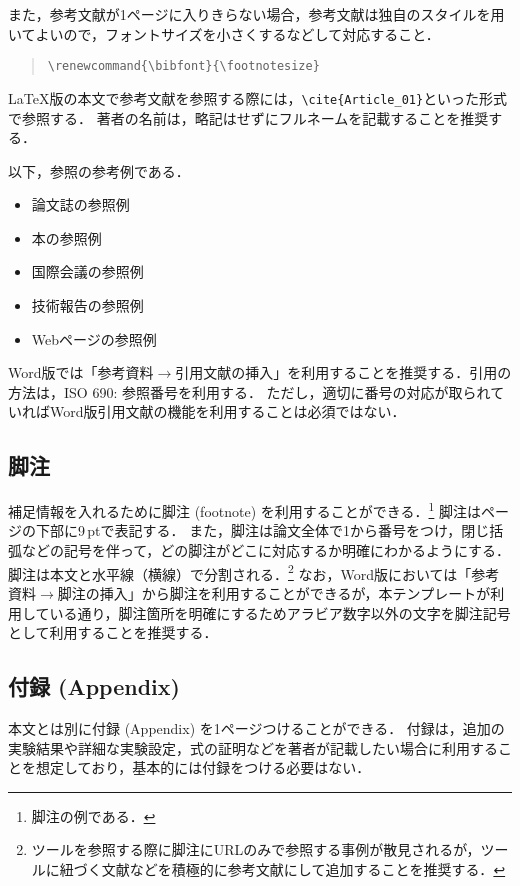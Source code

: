 \documentclass[
  platex, dvipdfmx,  %
]{nlp2024}
\begin{document}
%
また，参考文献が1ページに入りきらない場合，参考文献は独自のスタイルを用いてよいので，フォントサイズを小さくするなどして対応すること．
\begin{quote}
\verb|\renewcommand{\bibfont}{\footnotesize}|
\end{quote}



LaTeX版の本文で参考文献を参照する際には，\verb|\cite{Article_01}|といった形式で参照する．
%
著者の名前は，略記はせずにフルネームを記載することを推奨する．

以下，参照の参考例である．
\begin{itemize}
\item 論文誌の参照例 \cite{Article_01}
\item 本の参照例 \cite{Book_02}
\item 国際会議の参照例 \cite{Inproc_03}
\item 技術報告の参照例 \cite{Techrep_05}
\item Webページの参照例 \cite{Web_06}
\end{itemize}

Word版では「参考資料$\xrightarrow{}$引用文献の挿入」を利用することを推奨する．引用の方法は，ISO 690: 参照番号を利用する．
ただし，適切に番号の対応が取られていればWord版引用文献の機能を利用することは必須ではない．


\subsection{脚注}
補足情報を入れるために脚注 (footnote) を利用することができる．\footnote{脚注の例である．}
脚注はページの下部に9\,ptで表記する．
また，脚注は論文全体で1から番号をつけ，閉じ括弧などの記号を伴って，どの脚注がどこに対応するか明確にわかるようにする．
脚注は本文と水平線（横線）で分割される．\footnote{ツールを参照する際に脚注にURLのみで参照する事例が散見されるが，ツールに紐づく文献などを積極的に参考文献にして追加することを推奨する．}
なお，Word版においては「参考資料$\xrightarrow{}$脚注の挿入」から脚注を利用することができるが，本テンプレートが利用している通り，脚注箇所を明確にするためアラビア数字以外の文字を脚注記号として利用することを推奨する．



\subsection{付録 (Appendix)}
\label{sec:appendix}
本文とは別に付録 (Appendix) を1ページつけることができる．
付録は，追加の実験結果や詳細な実験設定，式の証明などを著者が記載したい場合に利用することを想定しており，基本的には付録をつける必要はない．
\end{document}
